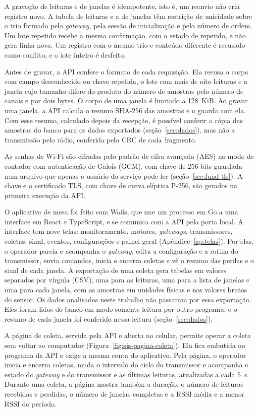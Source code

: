 A gravação de leituras e de janelas é idempotente, isto é, um reenvio não cria registro novo. A tabela de leituras e a de janelas têm restrição de unicidade sobre o trio formado pelo \textit{gateway}, pela sessão de inicialização e pelo número de ordem. Um lote repetido recebe a mesma confirmação, com o estado de repetido, e não gera linha nova. Um registro com o mesmo trio e conteúdo diferente é recusado como conflito, e o lote inteiro é desfeito.

Antes de gravar, a API confere o formato de cada requisição. Ela recusa o corpo com campo desconhecido ou chave repetida, o lote com mais de oito leituras e a janela cujo tamanho difere do produto do número de amostras pelo número de canais e por dois bytes. O corpo de uma janela é limitado a \SI{128}{KiB}. Ao gravar uma janela, a API calcula o resumo SHA-256 das amostras e o guarda com ela. Com esse resumo, calculado depois da recepção, é possível conferir a cópia das amostras do banco para os dados exportados (seção~\ref{sec:dados}), mas não a transmissão pelo rádio, conferida pelo CRC de cada fragmento.

As senhas de Wi-Fi são cifradas pelo padrão de cifra avançada (AES) no modo de contador com autenticação de Galois (GCM), com chave de \num{256} bits guardada num arquivo que apenas o usuário do serviço pode ler (seção~\ref{sec:fund-tls}). A chave e o certificado TLS, com chave de curva elíptica P-256, são gerados na primeira execução da API.

O aplicativo de mesa foi feito com Wails, que une um processo em Go a uma interface em React e TypeScript, e se comunica com a API pela porta local. A interface tem nove telas: monitoramento, motores, \textit{gateways}, transmissores, coletas, sinal, eventos, configurações e painel geral (Apêndice~\ref{ap:telas}). Por elas, o operador pareia e acompanha o \textit{gateway}, edita a configuração e a rotina do transmissor, envia comandos, inicia e encerra coletas e vê o resumo das perdas e o sinal de cada janela. A exportação de uma coleta gera tabelas em valores separados por vírgula (CSV), uma para as leituras, uma para a lista de janelas e uma para cada janela, com as amostras em unidades físicas e nos valores brutos do sensor. Os dados analisados neste trabalho não passaram por essa exportação. Eles foram lidos do banco em modo somente leitura por outro programa, e o resumo de cada janela foi conferido nessa leitura (seção~\ref{sec:dados}).

A página de coleta, servida pela API e aberta no celular, permite operar a coleta sem voltar ao computador (Figura~\ref{fig:sis-pagina-coleta}). Ela fica embutida no programa da API e exige a mesma conta do aplicativo. Pela página, o operador inicia e encerra coletas, muda o intervalo do ciclo do transmissor e acompanha o estado do \textit{gateway} e do transmissor e as últimas leituras, atualizadas a cada \SI{5}{\second}. Durante uma coleta, a página mostra também a duração, o número de leituras recebidas e perdidas, o número de janelas completas e a RSSI média e a menor RSSI do período.

